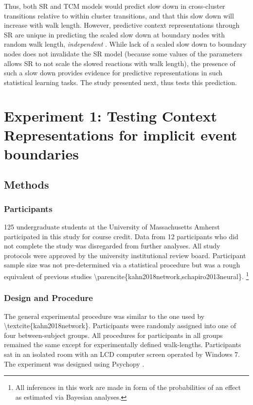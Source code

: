 Thus, both SR and TCM models would predict slow down in cross-cluster transitions relative to within cluster transitions, and that this slow down will increase with walk length. However, predictive context representations through SR are unique in predicting the scaled slow down at boundary nodes with random walk length, \textit{independent} . While lack of a scaled slow down to boundary nodes does not invalidate the SR model (because some values of the parameters allows SR to not scale the slowed reactions with walk length), the presence of such a slow down provides evidence for predictive representations in such statistical learning tasks. The study presented next, thus tests this prediction. 

\section{Experiment 1: Testing Context Representations for implicit event boundaries}

\subsection{Methods}

\subsubsection*{Participants}
125 undergraduate students at the University of Massachusetts Amherst participated in this study for course credit. Data from 12 participants who did not complete the study was disregarded from further analyses. All study protocols were approved by the university institutional review board. \ac{Participant sample size was not pre-determined via a statistical procedure but was a rough equivalent of previous studies \parencite{kahn2018network,schapiro2013neural}}. \footnote{All inferences in this work are made in form of the probabilities of an effect as estimated via Bayesian analyses.}

\subsubsection*{Design and Procedure}

\ac{The general experimental procedure was similar to the one used by \textcite{kahn2018network}}. Participants were randomly assigned into one of four between-subject groups. All procedures for participants in all groups remained the same except for experimentally defined walk-lengths. Participants sat in an isolated room with an LCD computer screen operated by Windows 7. The experiment was designed using Psychopy \parencite{peirce2007psychopy}. 


